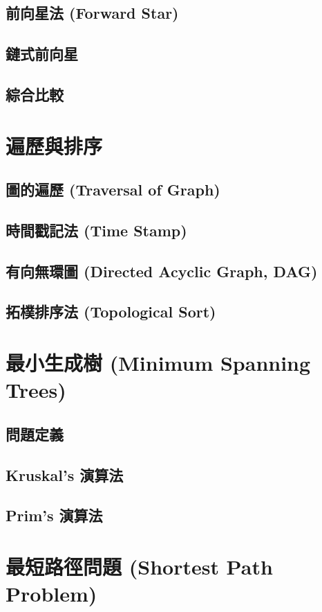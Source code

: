 \subsection{前向星法 (Forward Star)}
\subsection{鏈式前向星}
\subsection{綜合比較}

\section{遍歷與排序}
\subsection{圖的遍歷 (Traversal of Graph)}
\subsection{時間戳記法 (Time Stamp)}
\subsection{有向無環圖 (Directed Acyclic Graph, DAG)}
\subsection{拓樸排序法 (Topological Sort)}

\section{最小生成樹 (Minimum Spanning Trees)}
\subsection{問題定義}
\subsection{Kruskal's 演算法}
\subsection{Prim's 演算法}

\section{最短路徑問題 (Shortest Path Problem)}
